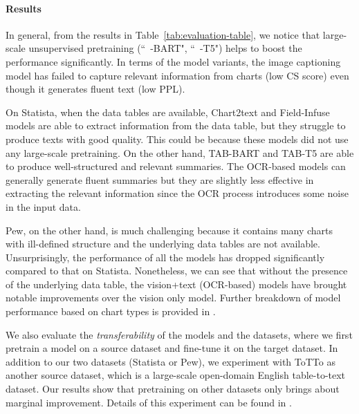 \paragraph{Results}


In general, from the results in Table~\ref{tab:evaluation-table}, we notice that large-scale unsupervised pretraining (\ie ``~-BART", ``~-T5") helps to boost the performance significantly. In terms of the model variants, the image captioning model has failed to capture relevant information from charts (low CS score) even though it generates fluent text (low PPL).

On Statista, when the data tables are available,  Chart2text and Field-Infuse models are able to extract information from the data table, but they struggle to produce texts with good quality. {This could be because these models did not use any large-scale pretraining.} On the other hand, TAB-BART and TAB-T5 are able to produce well-structured and relevant summaries. The OCR-based models can generally generate fluent summaries but they are slightly less effective in extracting the relevant information since the OCR process introduces some noise in the input data. 



Pew, on the other hand, is much challenging because it contains many charts with ill-defined structure and the underlying data tables are not available. Unsurprisingly, the performance of all the models has dropped significantly compared to that on Statista. Nonetheless, we can see that without the presence of the underlying data table, the vision+text (OCR-based) models have brought notable improvements over the vision only model. {Further breakdown of model performance based on chart types is provided in .} 


We also evaluate the \emph{transferability} of the models and the datasets, where we first pretrain a model on a source dataset and fine-tune it on the target dataset. In addition to our two datasets (Statista or Pew), we experiment with ToTTo \cite{parikh2020totto} as another source dataset, which is a large-scale open-domain English table-to-text dataset.
Our results show that pretraining on other datasets only brings about marginal improvement. Details of this experiment can be found in .




